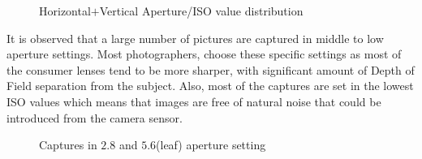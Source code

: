 \begin{figure}[ht!]
    \centering  
    \caption{Horizontal$+$Vertical Aperture/ISO value distribution}
    \label{c4:all_dof_iso_values}
\end{figure}

It is observed that a large number of pictures are captured in middle to low aperture settings. Most photographers, choose these specific settings as most of the consumer lenses tend to be more sharper, with significant amount of Depth of Field separation from the subject.
Also, most of the captures are set in the lowest ISO values which means that images are free of natural noise that could be introduced from the camera sensor.

\begin{figure}[ht!]
    \centering  
    \caption{Captures in $2.8$ and $5.6$(leaf) aperture setting}
    \label{c4:bokeh_captures}
\end{figure}

